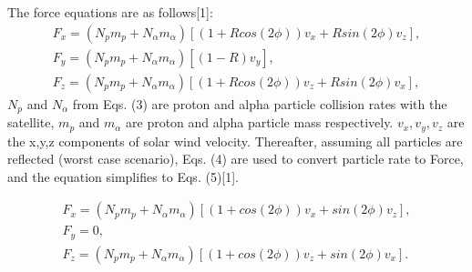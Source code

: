 \documentclass[%
 reprint,
 amsmath,amssymb,
 aps,
]{revtex4-2}
\begin{document}
The force equations are as follows[1]:
\begin{equation}\label{eq:Hanning Window}
\begin{split}
F_{x}=(N_{p}m_{p}+N_{\alpha}m_{\alpha})[(1+Rcos(2\phi))v_{x}+Rsin(2\phi)v_{z}], \\ F_{y}=(N_{p}m_{p}+N_{\alpha}m_{\alpha})[(1-R)v_{y}], \\ F_{z}=(N_{p}m_{p}+N_{\alpha}m_{\alpha})[(1+Rcos(2\phi))v_{z}+Rsin(2\phi)v_{x}],
\end{split}
\end{equation}
 \(N_{p}\) and \(N_{\alpha}\) from Eqs. (3) are proton and alpha particle collision rates with the satellite, \(m_{p}\) and \(m_{\alpha}\) are proton and alpha particle mass respectively. \(v_{x},v_{y},v_{z}\) are the x,y,z components of solar wind velocity. Thereafter, assuming all particles are reflected (worst case scenario), Eqs. (4) are used to convert particle rate to Force, and the equation simplifies to Eqs. (5)[1].



\begin{equation}\label{eq:Hanning Window}
\begin{split}
F_{x}=(N_{p}m_{p}+N_{\alpha}m_{\alpha})[(1+cos(2\phi))v_{x}+sin(2\phi)v_{z}], \\ F_{y}=0, \\ F_{z}=(N_{p}m_{p}+N_{\alpha}m_{\alpha})[(1+cos(2\phi))v_{z}+sin(2\phi)v_{x}].
\end{split}
\end{equation}
\end{document}
